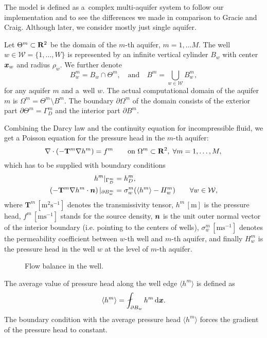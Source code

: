 \documentclass[dvipsnames,FM,Dis]{tulthesis}
\newcommand{\figpath}{figures/}
\newcommand{\noteJB}[1]{{\color{Blue} \textbf{JB: } \textit{#1}}}
\begin{document}
The model is defined as a~complex multi-aquifer system to follow our implementation and to see the differences
we made in comparison to Gracie and Craig. Although later, we consider mostly just single aquifer.

Let $\Theta^m\subset {\rm\bf R}^2$ be the domain of the $m$-th aquifer, $m=1,\ldots M$.
The well $w\in\mathcal{W}=\{1,\ldots,W\}$ is represented by an infinite vertical cylinder $B_w$
with center $\mathbf{\boldsymbol{x}}_w$ and radius $\rho_w$.  We further denote 
\[
 B^m_w = B_w \cap \Theta^m, \quad \text{and} \quad
 B^m=\bigcup_{w\in \mathcal{W}}B^m_w,
\]
for any aquifer $m$ and a~well $w$.
The actual computational domain of the aquifer $m$ is $\Omega^m = \Theta^m\setminus B^m$. The boundary $\partial\Omega^m$ of 
the domain consists of the exterior part $\partial\Theta^m=\Gamma^m_D$ and the interior part $\partial B^m$.


Combining the Darcy law and the continuity equation for incompressible fluid, we get
a Poisson equation for the pressure head in the $m$-th aquifer:
\begin{equation} \label{eqn:poisson}
\nabla\cdot(-\mathbf{T}^m\nabla h^m) = f^m \qquad \textrm{on } \Omega^m\subset{\rm\bf R}^2,\; \forall m=1,\dots,M, \\
\end{equation}
which has to be supplied with boundary conditions
\begin{align}
h^m|_{\Gamma^m_D} &= h^m_D, \\
\label{eq:interior_bc}
\left(-\mathbf{T}^m\nabla h^m\cdot\mathbf{\boldsymbol{n}}\right)|_{\partial B^m_w} &= \sigma^m_w(\langle h^m \rangle - H^m_w) \qquad \forall w\in\mathcal{W},
\end{align}
%
where $\mathbf{T}^m\, [\textrm{m}^2\textrm{s}^{-1}]$ denotes the transmissivity tensor,
$h^m\, [\textrm{m}]$ is the pressure head, $f^m\, [\textrm{m}\textrm{s}^{-1}]$ stands for the source density,
$\mathbf{\boldsymbol{n}}$ is the unit outer normal vector of the interior boundary (i.e. pointing to the centers of wells),
$\sigma^m_w\, [\textrm{m}\textrm{s}^{-1}]$ denotes the permeability coefficient between $w$-th well and 
$m$-th aquifer, and finally $H_w^m$ is the pressure head in the well $w$ at the level of $m$-th aquifer.
%
\begin{figure}[!htb]
  \begin{center}         
    \def\svgwidth{0.5\textwidth}
    
  \end{center}
  \caption{Flow balance in the well.}
  \label{fig:well_flows}
\end{figure}
%
The average value of pressure head along the well edge $\langle{h^m}\rangle$ is defined as
\[\langle{h^m}\rangle = \fint_{\partial B_w} h^m  \dd\bx.\]
The boundary condition with the average pressure head $\langle{h^m}\rangle$ forces the gradient
of the pressure head to constant.
\end{document}

